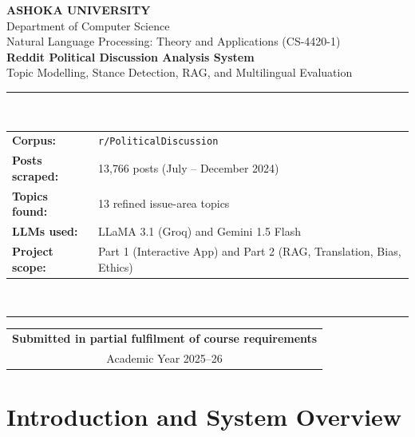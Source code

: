 \documentclass[11pt,a4paper]{article}
\begin{document}
\begin{titlepage}
\thispagestyle{empty}
\begin{center}
\vspace*{1.8cm}

{\large\bfseries ASHOKA UNIVERSITY}\\[0.2cm]
{\normalsize Department of Computer Science}\\[0.15cm]
{\normalsize Natural Language Processing: Theory and Applications (CS-4420-1)}\\[2.2cm]

{\LARGE\bfseries Reddit Political Discussion Analysis System}\\[0.5cm]
{\large Topic Modelling, Stance Detection, RAG, and Multilingual Evaluation}\\[2.0cm]

\rule{0.78\textwidth}{0.6pt}\\[0.6cm]
\begin{tabular}{ll}
\textbf{Corpus:} & \texttt{r/PoliticalDiscussion} \\
\textbf{Posts scraped:} & 13{,}766 posts (July -- December 2024) \\
\textbf{Topics found:} & 13 refined issue-area topics \\
\textbf{LLMs used:} & LLaMA 3.1 (Groq) and Gemini 1.5 Flash \\
\textbf{Project scope:} & Part 1 (Interactive App) and Part 2 (RAG, Translation, Bias, Ethics) \\
\end{tabular}\\[0.6cm]
\rule{0.78\textwidth}{0.6pt}

\vfill

\begin{tabular}{c}
\textbf{Submitted in partial fulfilment of course requirements} \\
Academic Year 2025--26
\end{tabular}

\end{center}
\end{titlepage}

\tableofcontents
\newpage

\section{Introduction and System Overview}
\end{document}
